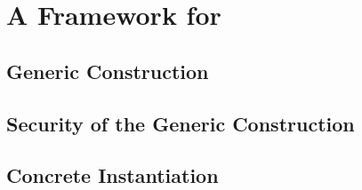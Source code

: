 \section{A Framework for \UAS}
\label{sec:construction}

\subsection{Generic Construction}
\label{ssec:framework}

\subsection{Security of the Generic Construction}
\label{ssec:proofs}

\subsection{Concrete Instantiation}
\label{ssec:instantiation}

